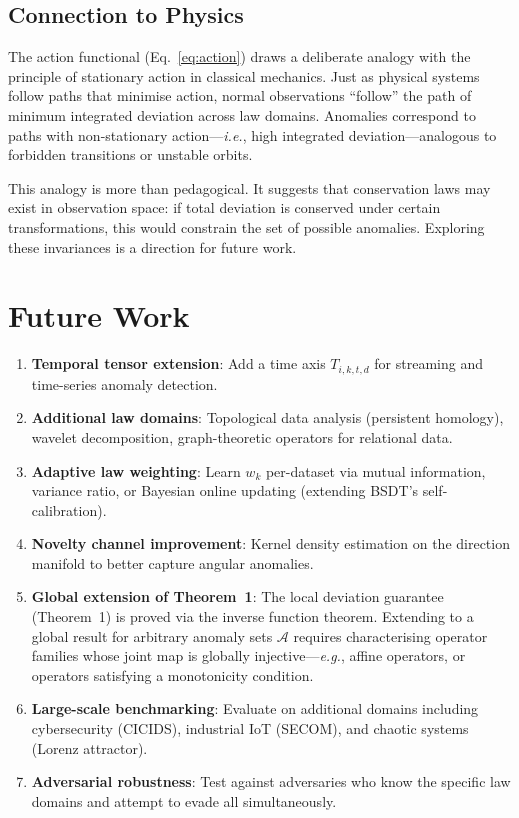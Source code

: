 \documentclass[journal]{IEEEtran}
\newcommand{\ie}{\textit{i.e.}}
\newcommand{\eg}{\textit{e.g.}}
\begin{document}
\subsection{Connection to Physics}

The action functional (Eq.~\eqref{eq:action}) draws a deliberate analogy with the principle of stationary action in classical mechanics. Just as physical systems follow paths that minimise action, normal observations ``follow'' the path of minimum integrated deviation across law domains. Anomalies correspond to paths with non-stationary action---\ie, high integrated deviation---analogous to forbidden transitions or unstable orbits.

This analogy is more than pedagogical. It suggests that conservation laws may exist in observation space: if total deviation is conserved under certain transformations, this would constrain the set of possible anomalies. Exploring these invariances is a direction for future work.

\section{Future Work}
\label{sec:future}

\begin{enumerate}
  \item \textbf{Temporal tensor extension}: Add a time axis $T_{i,k,t,d}$ for streaming and time-series anomaly detection.
  \item \textbf{Additional law domains}: Topological data analysis (persistent homology), wavelet decomposition, graph-theoretic operators for relational data.
  \item \textbf{Adaptive law weighting}: Learn $w_k$ per-dataset via mutual information, variance ratio, or Bayesian online updating (extending BSDT's self-calibration).
  \item \textbf{Novelty channel improvement}: Kernel density estimation on the direction manifold to better capture angular anomalies.
  \item \textbf{Global extension of Theorem~1}: The local deviation guarantee (Theorem~1) is proved via the inverse function theorem. Extending to a global result for arbitrary anomaly sets $\mathcal{A}$ requires characterising operator families whose joint map is globally injective---\eg, affine operators, or operators satisfying a monotonicity condition.
  \item \textbf{Large-scale benchmarking}: Evaluate on additional domains including cybersecurity (CICIDS), industrial IoT (SECOM), and chaotic systems (Lorenz attractor).
  \item \textbf{Adversarial robustness}: Test against adversaries who know the specific law domains and attempt to evade all simultaneously.
\end{enumerate}
\end{document}
